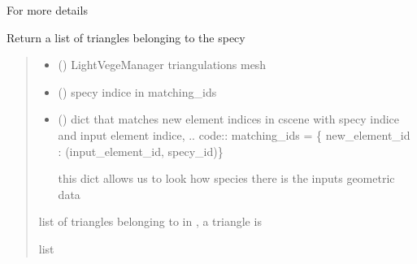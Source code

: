 \documentclass[letterpaper,10pt,english]{sphinxmanual}
\begin{document}
\nopagebreak


\sphinxAtStartPar
For more details {\hyperref[\detokenize{inputs:inputs}]{}}



\begin{fulllineitems}
\label{\detokenize{reference:trianglesmesh.triangles_entity}}
\pysigstartsignatures
{}
\pysigstopsignatures
\sphinxAtStartPar
Return a list of triangles belonging to the specy 
\begin{quote}\begin{description}
\begin{itemize}
\item {} 
\sphinxAtStartPar
{} () \textendash{} LightVegeManager triangulations mesh

\item {} 
\sphinxAtStartPar
{} () \textendash{} specy indice in matching\_ids

\item {} 
\sphinxAtStartPar
{} () \textendash{} 
\sphinxAtStartPar
dict that matches new element indices in cscene with specy indice and
input element indice,
.. code:: matching\_ids = \{ new\_element\_id : (input\_element\_id, specy\_id)\}

\sphinxAtStartPar
this dict allows us to look how species there is the inputs geometric data


\end{itemize}

\sphinxAtStartPar
list of triangles belonging to  in , a triangle is \sphinxcode{\sphinxupquote{{[}(x1, y1, z1), (x2, y2, z2), (x3, y3, z3){]}}}

\sphinxAtStartPar
list

\end{description}\end{quote}

\end{fulllineitems}
\end{document}
